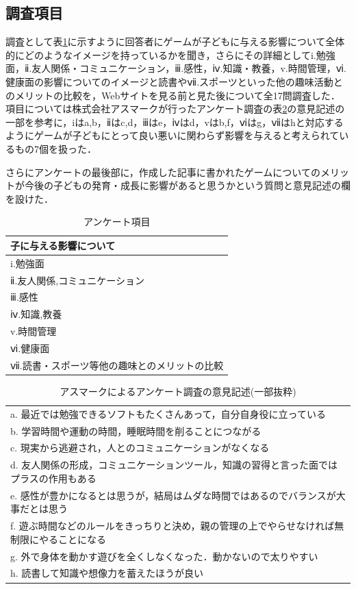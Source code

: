 \documentclass[12pt,a4j,titlepage]{ltjsarticle}
\begin{document}
\subsection{調査項目}\label{調査項目}
調査として表\ref{table:anque}に示すように回答者にゲームが子どもに与える影響について全体的にどのようなイメージを持っているかを聞き，さらにその詳細としてi.勉強面，ⅱ.友人関係・コミュニケーション，ⅲ.感性，ⅳ.知識・教養，v.時間管理，ⅵ.健康面の影響についてのイメージと読書やⅶ.スポーツといった他の趣味活動とのメリットの比較を，Webサイトを見る前と見た後について全17問調査した．
項目については株式会社アスマークが行ったアンケート調査\cite{gameanq}の表\ref{table:asmarqanque}の意見記述の一部を参考に，iはa,b，ⅱはc,d，ⅲはe，ⅳはd，vはb,f，ⅵはg，ⅶはhと対応するようにゲームが子どもにとって良い悪いに関わらず影響を与えると考えられているもの7個を扱った．

さらにアンケートの最後部に，作成した記事に書かれたゲームについてのメリットが今後の子どもの発育・成長に影響があると思うかという質問と意見記述の欄を設けた．

\begin{table}[H]
 \caption{アンケート項目}
 \label{table:anque}
 \small
 \centering
  \begin{tabular}{l}
  \hline
  子に与える影響について \\
   \hline
    i.勉強面 \\
   ⅱ.友人関係,コミュニケーション\\
   ⅲ.感性\\
   ⅳ.知識,教養 \\
    v.時間管理   \\
   ⅵ.健康面 \\
   ⅶ.読書・スポーツ等他の趣味とのメリットの比較 \\
   \hline
  \end{tabular}
\end{table}


\begin{table}[H]
 \caption{アスマークによるアンケート調査の意見記述(一部抜粋)}
 \label{table:asmarqanque}
 \small
 \centering
  \begin{tabular}{l}
  \hline
   a. 最近では勉強できるソフトもたくさんあって，自分自身役に立っている\\
   b. 学習時間や運動の時間，睡眠時間を削ることにつながる \\
   c. 現実から逃避され，人とのコミュニケーションがなくなる \\
   d. 友人関係の形成，コミュニケーションツール，知識の習得と言った面ではプラスの作用もある \\
   e. 感性が豊かになるとは思うが，結局はムダな時間ではあるのでバランスが大事だとは思う \\
   f. 遊ぶ時間などのルールをきっちりと決め，親の管理の上でやらせなければ無制限にやることになる\\
   g. 外で身体を動かす遊びを全くしなくなった．動かないので太りやすい \\
   h. 読書して知識や想像力を蓄えたほうが良い \\
   \hline
  \end{tabular}
\end{table}
\end{document}
